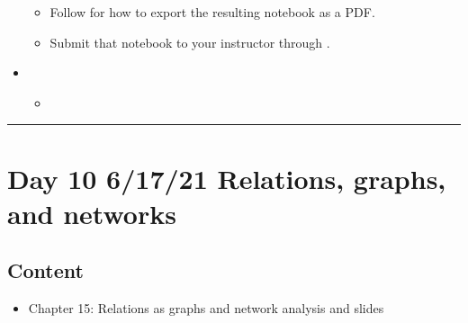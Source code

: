 \documentclass[letterpaper,10pt,english]{jupyterBook}
\begin{document}
\begin{itemize}
\begin{itemize}
\item {} 
\sphinxAtStartPar
Follow  for how to export the resulting notebook as a PDF.

\item {} 
\sphinxAtStartPar
Submit that notebook to your instructor through .

\end{itemize}

\item {} 
\sphinxAtStartPar
{}
\begin{itemize}
\item {} 
\sphinxAtStartPar
{\hyperref[\detokenize{chapter-15-networks::doc}]{}}

\end{itemize}

\end{itemize}


\bigskip\hrule\bigskip



\section{Day 10 \sphinxhyphen{} 6/17/21 \sphinxhyphen{} Relations, graphs, and networks}
\label{\detokenize{course-schedule:day-10-6-17-21-relations-graphs-and-networks}}

\subsection{Content}
\label{\detokenize{course-schedule:id17}}\begin{itemize}
\item {} 
\sphinxAtStartPar
Chapter 15: Relations as graphs and network analysis \sphinxhyphen{} {\hyperref[\detokenize{chapter-15-networks::doc}]{}} and slides

\end{itemize}
\end{document}
